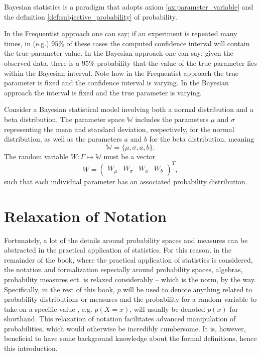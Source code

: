 \begin{definition}
	\label{def:bayesian_statistics}
	Bayesian statistics is a paradigm that adopts axiom \ref{ax:parameter_variable} and the definition \ref{def:subjective_probability} of probability. 
\end{definition}

\begin{example}
	\label{def:frequentist_statistics}
	In the Frequentist approach one can say; if an experiment is repeated many times, in (e.g.) $95 \%$ of these cases the computed confidence interval will contain the true parameter value.\newline
	In the Bayesian approach one can say; given the observed data, there is a $95 \%$ probability that the value of the true parameter lies within the Bayesian interval.\newline
	Note how in the Frequentist approach the true parameter is fixed and the confidence interval is varying. In the Bayesian approach the interval is fixed and the true parameter is varying. 
\end{example}

\begin{example}
	Consider a Bayesian statistical model involving both a normal distribution and a beta distribution. The parameter space $\mathbb{W}$ includes the parameters $\mu$ and $\sigma$ representing the mean and standard deviation, respectively, for the normal distribution, as well as the parameters $a$ and $b$ for the beta distribution, meaning 
\begin{equation}
\mathbb{W} = \{\mu, \sigma, a, b\}.
\end{equation}
The random variable $W: \Gamma \mapsto \mathbb{W}$ must be a vector 
\begin{equation}
	W = \begin{pmatrix}
		W_\mu & W_\sigma & W_a & W_b
		\end{pmatrix}^T,
\end{equation}
such that each individual parameter has an associated probability distribution.
\end{example}

\section{Relaxation of Notation}
\label{sec:notation}
Fortunately, a lot of the details around probability spaces and measures can be abstracted in the practical application of statistics. For this reason, in the remainder of the book, where the practical application of statistics is considered, the notation and formalization especially around probability spaces, algebras, probability measures ect. is relaxed considerably -- which is the norm, by the way. Specifically, in the rest of this book, $p$ will be used to denote anything related to probability distributions or measures and the probability for a random variable to take on a specific value , e.g. $p(X=x)$, will usually be denoted $p(x)$ for shorthand. This relaxation of notation facilitates advanced manipulation of probabilities, which would otherwise be incredibly cumbersome. It is, however, beneficial to have some background knowledge about the formal definitions, hence this introduction.
